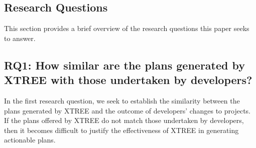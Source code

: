 \documentclass[10pt,journal,compsoc]{IEEEtran}
\newcommand{\bi}{\begin{itemize}} %
\newcommand{\ei}{\end{itemize}}
\newcommand{\tion}[1]{\S\ref{sect:#1}}
\begin{document}

\subsection{Research Questions}
\label{sect:rqs}


This section provides a brief overview of the research questions this paper seeks to answer.

\subsection*{RQ1: How similar are the plans generated by XTREE with those undertaken by developers?}

In the first research question, we seek to establish the similarity between the 
plans generated by XTREE and the outcome of developers' changes to projects. If 
the plans offered by XTREE do not match those undertaken by developers, then it 
becomes difficult to justify the effectiveness of XTREE in generating 
actionable plans.\\[-0.1cm]
\end{document}
